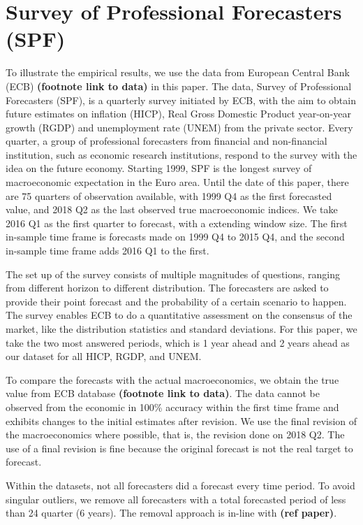 \documentclass[11pt]{article}
\begin{document}
\section{Survey of Professional Forecasters
(SPF)}\label{survey-of-professional-forecasters-spf}

To illustrate the empirical results, we use the data from European Central Bank (ECB)
\textbf{(footnote link to data)} in this paper. The data, Survey of Professional Forecasters (SPF), is a
quarterly survey initiated by ECB, with the aim to obtain future
estimates on inflation (HICP), Real Gross Domestic Product year-on-year growth (RGDP) and unemployment rate (UNEM) from
the private sector. Every quarter, a group of professional forecasters
from financial and non-financial institution, such as economic research
institutions, respond to the survey with the idea on the future
economy. Starting 1999, SPF is the longest survey of macroeconomic
expectation in the Euro area. Until the date of this paper, there are 75
quarters of observation available, with 1999 Q4 as the first forecasted
value, and 2018 Q2 as the last observed true macroeconomic indices. We take 2016 Q1 as the first quarter to forecast, with a extending window size. The first in-sample time frame is forecasts made on 1999 Q4 to 2015 Q4, and the second in-sample time frame adds 2016 Q1 to the first.

The set up of the survey consists of multiple magnitudes of questions,
ranging from different horizon to different distribution. The
forecasters are asked to provide their point forecast and the
probability of a certain scenario to happen. The survey enables ECB to
do a quantitative assessment on the consensus of the market, like the
distribution statistics and standard deviations. For this paper, we take
the two most answered periods, which is 1 year ahead and 2 years ahead
as our dataset for all HICP, RGDP, and UNEM.

To compare the forecasts with the actual macroeconomics, we obtain the
true value from ECB database \textbf{(footnote link to data)}. The data
cannot be observed from the economic in 100\% accuracy within the first
time frame and exhibits changes to the initial estimates after
revision. We use the final revision of the macroeconomics where
possible, that is, the revision done on 2018 Q2. The use of a final revision is fine because the
original forecast is not the real target to forecast.

Within the datasets, not all forecasters did a forecast every time
period. To avoid singular outliers, we remove all forecasters with a
total forecasted period of less than 24 quarter (6 years). The removal
approach is in-line with \textbf{(ref paper)}.
\end{document}
